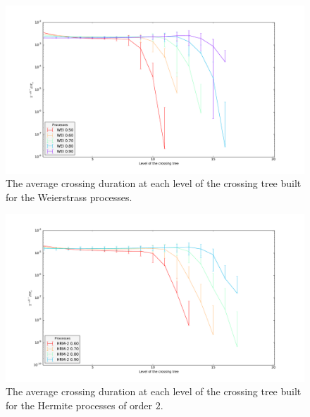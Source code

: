 \documentclass[a4paper]{article}
\begin{document}
\begin{figure}[htb]\begin{center}
    \includegraphics[width=6in]{images/fig_08_med_WEI_10000-17}
    \caption{The average crossing duration at each level of the crossing tree built
    for the Weierstrass processes.}
\label{fig:wei_durations}
\end{center}\end{figure}

\begin{figure}[htb]\begin{center}
    \includegraphics[width=6in]{images/fig_08_med_HRM-2_10000-17}
    \caption{The average crossing duration at each level of the crossing tree built
    for the Hermite processes of order $2$.}
\label{fig:hrm_2_durations}
\end{center}\end{figure}
\end{document}
